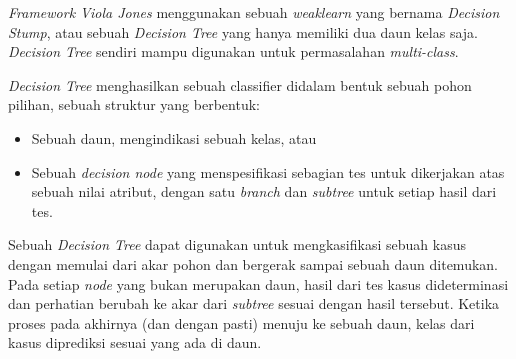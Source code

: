 \emph{Framework Viola Jones} menggunakan sebuah \emph{weaklearn} yang bernama 
\emph{Decision Stump}, atau sebuah \emph{Decision Tree} yang hanya memiliki 
dua daun kelas saja. \emph{Decision Tree} sendiri mampu digunakan untuk 
permasalahan \emph{multi-class}.

\emph{Decision Tree} menghasilkan sebuah classifier didalam bentuk sebuah pohon 
pilihan, sebuah struktur yang berbentuk:
\begin{itemize}
  \item Sebuah daun, mengindikasi sebuah kelas, atau
  \item Sebuah \emph{decision node} yang menspesifikasi 
  sebagian tes untuk dikerjakan atas sebuah nilai 
  atribut, dengan satu \emph{branch} dan \emph{subtree} untuk 
  setiap hasil dari tes.
\end{itemize}

Sebuah \emph{Decision Tree} dapat digunakan untuk mengkasifikasi sebuah kasus 
dengan memulai dari akar pohon dan bergerak sampai sebuah daun ditemukan. 
Pada setiap \emph{node} yang bukan merupakan daun, hasil dari tes kasus 
dideterminasi dan perhatian berubah ke akar dari \emph{subtree} sesuai 
dengan hasil tersebut. Ketika proses pada akhirnya (dan dengan pasti) 
menuju ke sebuah daun, kelas dari kasus diprediksi sesuai yang ada di daun.



